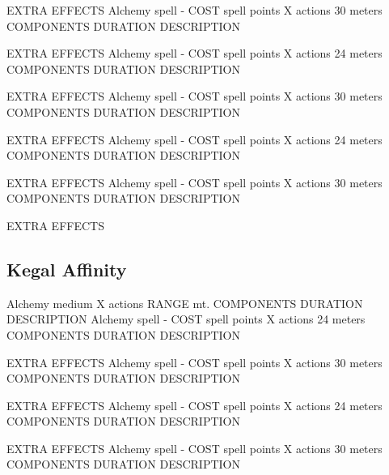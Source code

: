         EXTRA EFFECTS
        {Alchemy spell - COST spell points}
        {X actions}
        {30 meters}
        {COMPONENTS}
        {DURATION}
        DESCRIPTION

        EXTRA EFFECTS
        {Alchemy spell - COST spell points}
        {X actions}
        {24 meters}
        {COMPONENTS}
        {DURATION}
        DESCRIPTION

        EXTRA EFFECTS
        {Alchemy spell - COST spell points}
        {X actions}
        {30 meters}
        {COMPONENTS}
        {DURATION}
        DESCRIPTION

        EXTRA EFFECTS
        {Alchemy spell - COST spell points}
        {X actions}
        {24 meters}
        {COMPONENTS}
        {DURATION}
        DESCRIPTION

        EXTRA EFFECTS
        {Alchemy spell - COST spell points}
        {X actions}
        {30 meters}
        {COMPONENTS}
        {DURATION}
        DESCRIPTION

        EXTRA EFFECTS

\subsection*{Kegal Affinity}
        {Alchemy medium}
        {X actions}
        {RANGE mt.}
        {COMPONENTS}
        {DURATION}
        DESCRIPTION
        {Alchemy spell - COST spell points}
        {X actions}
        {24 meters}
        {COMPONENTS}
        {DURATION}
        DESCRIPTION

        EXTRA EFFECTS
        {Alchemy spell - COST spell points}
        {X actions}
        {30 meters}
        {COMPONENTS}
        {DURATION}
        DESCRIPTION

        EXTRA EFFECTS
        {Alchemy spell - COST spell points}
        {X actions}
        {24 meters}
        {COMPONENTS}
        {DURATION}
        DESCRIPTION

        EXTRA EFFECTS
        {Alchemy spell - COST spell points}
        {X actions}
        {30 meters}
        {COMPONENTS}
        {DURATION}
        DESCRIPTION

